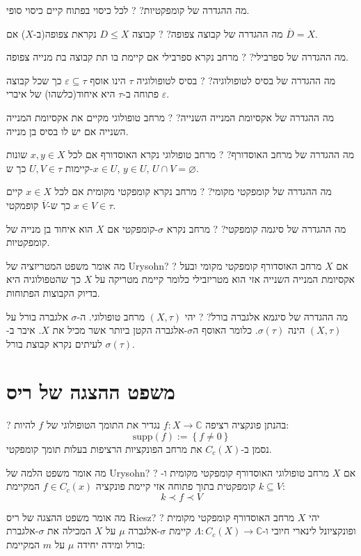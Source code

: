 \documentclass{tstextbook}
\begin{document}
מה ההגדרה של קומפקטיות?
?
לכל כיסוי בפתוח קיים כיסוי סופי.

מה ההגדרה של קבוצה צפופה?
?
קבוצה \(D\leq X\) נקראת צפופה(ב-\(X\)) אם \(\overline{D}=X\).

מה ההגדרה של ספרבילי?
?
מרחב נקרא ספרבילי אם קיימת בו תת קבוצה בת מנייה צפופה.

מה ההגדרה של בסיס לטופולוגיה?
?
בסיס לטופולוגיה \(\tau\) הינו אוסף \(\varepsilon \subseteq \tau\) כך שכל קבוצה פתוחה ב-\(\tau\) היא איחוד(כלשהו) של איברי \(\varepsilon\).

מה ההגדרה של אקסיומת המנייה השנייה?
?
מרחב טופולוגי מקיים את אקסיומת המנייה השנייה אם יש לו בסיס בן מנייה.

מה ההגדרה של מרחב האוסדורף?
?
מרחב טופולוגי נקרא האוסדורף אם לכל \(x,y \in X\) שונות קיימות \(U,V \in \tau\) כך ש-\(x \in U\), \(y \in U\), \(U\cap V = \varnothing\).

מה ההגדרה של קומפקטי מקומי?
?
מרחב נקרא קומפקטי מקומית אם לכל \(x \in X\) קיים \(x \in V \in \tau\) כך ש-\(\overline{V}\) קופמקטי.

מה ההגדרה של סיגמה קומפקטי?
?
מרחב נקרא \(\sigma\)-קומפקטי אם \(X\) הוא איחוד בן מנייה של קומפקטיות.

מה אומר משפט המטריזציה של Urysohn?
?
אם \(X\) מרחב האוסדורף קומפקטי מקומי ובעל אקסיומת המנייה השנייה אזי הוא מטריזבילי כלומר קיימת מטריקה על \(X\) כך שהטפולוגיה היא בדיוק הקבוצות הפתוחות.

מה ההגדרה של סיגמא אלגברה בורל?
?
יהי \(\left( X,\tau \right)\) מרחב טופולוגי. ה-\(\sigma\) אלגברה בורל על \(\left( X,\tau \right)\) הינה \(\sigma\left( \tau \right)\). כלומר האוסף ה\(\sigma\)-אלגברה הקטן ביותר אשר מכיל את \(X\). איבר ב-\(\sigma\left( \tau \right)\) לעיתים נקרא קבוצת בורל.

\section{משפט ההצגה של ריס}

?
בהנתן פונקציה רציפה \(f:X\to \mathbb{C}\) נגדיר את התומך הטופולוגי של \(f\) להיות:
$$\mathrm{supp}(f):= \left\{  f\neq 0  \right\}$$
נסמן ב-\(C_{c}(X)\) את מרחב הפונקציות הרציפות בעלות תומך קומפקטי.

מה אומר משפט הלמה של Urysohn?
?
אם \(X\) מרחב טופולוגי האוסדורף קומפקטי מקומית ו-\(k\subseteq V\) קומפקטית בתוך פתוחה אזי קיימת פונקציה \(f\in C_{c}(x)\) המקיימת:
$$k \prec f \prec V$$

מה אומר משפט ההצגה של ריס Riesz?
?
יהי \(X\) מרחב האוסדורף קומפקטי מקומית ופונקציונל לינארי חיובי ו-\(\Lambda:C_{c}(X)\to \mathbb{C}\) קיימת \(\sigma\)-אלגברה \(\mu\) על \(X\) המכילה את \(\sigma\)-אלגברת בורל ומידה יחידה \(\mu\) על \(m\) המקיימת:
\end{document}
